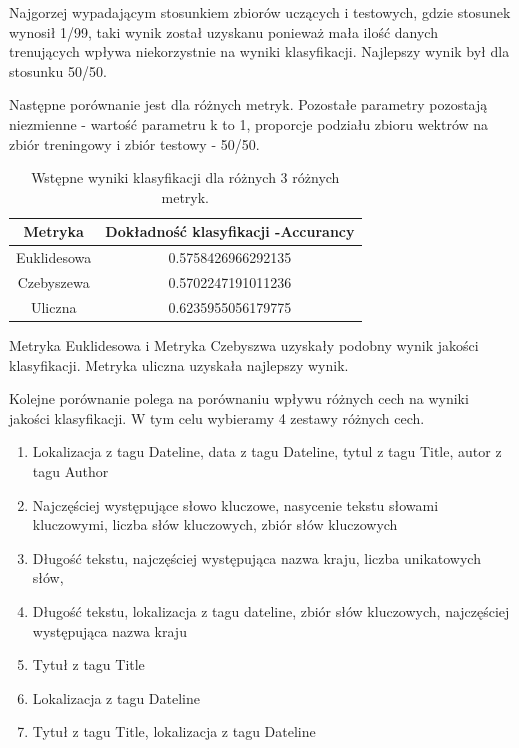 \documentclass{classrep}
\begin{document}
Najgorzej wypadającym stosunkiem zbiorów uczących i testowych, gdzie stosunek wynosił 1/99, taki wynik został uzyskanu ponieważ mała ilość danych trenujących wpływa niekorzystnie na wyniki klasyfikacji. Najlepszy wynik był dla stosunku 50/50. 

Następne porównanie jest dla różnych metryk. Pozostałe parametry pozostają niezmienne - wartość parametru k to 1, proporcje podziału zbioru wektrów na zbiór treningowy i zbiór testowy - 50/50. 

\begin{table}[h!]
 \caption{Wstępne wyniki klasyfikacji dla różnych 3 różnych metryk.}
 \centering
 \vspace{0.1cm}
 \begin{tabular}{c c}
  \textbf{Metryka} & \textbf{Dokładność klasyfikacji -Accurancy}\\
\hline
  Euklidesowa &0.5758426966292135\\
  Czebyszewa & 0.5702247191011236\\
  Uliczna & 0.6235955056179775\\
 \end{tabular}
 \label{wyniki klasyfikacji dla roznych 10 wartosci parametru k}
\end{table}

Metryka Euklidesowa i Metryka Czebyszwa uzyskały podobny wynik jakości klasyfikacji. Metryka uliczna uzyskała najlepszy wynik. 

Kolejne porównanie polega na porównaniu wpływu różnych cech na wyniki jakości klasyfikacji. W tym celu wybieramy 4 zestawy różnych cech. 
\begin{enumerate}
\item Lokalizacja z tagu Dateline, data z tagu Dateline, tytul z tagu Title, autor z tagu Author
\item Najczęściej występujące słowo kluczowe, nasycenie tekstu słowami kluczowymi, liczba słów kluczowych, zbiór słów kluczowych
\item Długość tekstu, najczęściej występująca nazwa kraju, liczba unikatowych słów, 
\item Długość tekstu, lokalizacja z tagu dateline, zbiór słów kluczowych, najczęściej występująca nazwa kraju
\item Tytuł z tagu Title
\item Lokalizacja z tagu Dateline
\item Tytuł z tagu Title, lokalizacja z tagu Dateline
\end{enumerate}
\end{document}
